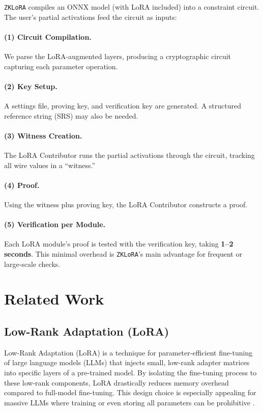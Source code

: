 \documentclass[11pt]{article}
\begin{document}
\texttt{ZKLoRA} compiles an ONNX model (with LoRA included) into a constraint circuit. The user’s partial activations feed the circuit as inputs:

\paragraph{(1) Circuit Compilation.} 
We parse the LoRA-augmented layers, producing a cryptographic circuit capturing each parameter operation. 

\paragraph{(2) Key Setup.} 
A settings file, proving key, and verification key are generated. A structured reference string (SRS) may also be needed.

\paragraph{(3) Witness Creation.}
The LoRA Contributor runs the partial activations through the circuit, tracking all wire values in a “witness.” 

\paragraph{(4) Proof.}
Using the witness plus proving key, the LoRA Contributor constructs a proof. 

\paragraph{(5) Verification per Module.}
Each LoRA module’s proof is tested with the verification key, taking \textbf{1--2 seconds}. This minimal overhead is \texttt{ZKLoRA}’s main advantage for frequent or large-scale checks.

\section{Related Work}

\subsection{Low-Rank Adaptation (LoRA)}
Low-Rank Adaptation (LoRA) \cite{hu2021lora} is a technique for parameter-efficient fine-tuning of large language models (LLMs) that injects small, low-rank adapter matrices into specific layers of a pre-trained model. By isolating the fine-tuning process to these low-rank components, LoRA drastically reduces memory overhead compared to full-model fine-tuning. This design choice is especially appealing for massive LLMs where training or even storing all parameters can be prohibitive \cite{ding2022delta}.
\end{document}
